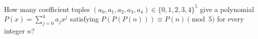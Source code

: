 How many coefficient tuples $(a_0,a_1,a_2,a_3,a_4)\in\{0,1,2,3,4\}^5$ give a polynomial $P(x)=\sum_{j=0}^4a_jx^j$ satisfying $P(P(P(n)))\equiv P(n)\pmod5$ for every integer $n$?
